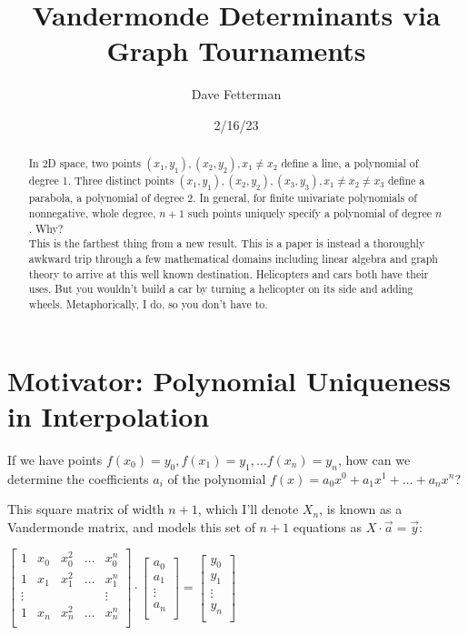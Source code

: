 \documentclass[11pt, oneside]{article} 	%
\title{Vandermonde Determinants via Graph Tournaments}
\author{Dave Fetterman}
\affil{Obviously Unemployed}
\date{2/16/23}
\begin{document}
\maketitle

\begin{abstract}

In 2D space, two points $(x_1, y_1), (x_2, y_2), x_1 \neq x_2$ define a line, a polynomial of degree 1.  Three distinct points $(x_1, y_1), (x_2, y_2), (x_3, y_3), x_1 \neq x_2 \neq x_3$ define a parabola, a polynomial of degree 2.  In general, for finite univariate polynomials of nonnegative, whole degree, $n+1$ such points uniquely specify a polynomial of degree $n$.  Why?
\\

This is the farthest thing from a new result. This is a paper is instead a thoroughly awkward trip through a few mathematical domains including linear algebra and graph theory to arrive at this well known destination. Helicopters and cars both have their uses. But you wouldn't build a car by turning a helicopter on its side and adding wheels.  Metaphorically, I do, so you don't have to.

\end{abstract}

\section{Motivator: Polynomial Uniqueness in Interpolation}

If we have points $f(x_0) = y_0, f(x_1) = y_1,  \ldots f(x_{n}) = y_{n}$, how can we determine the coefficients $a_i$ of the polynomial $f(x) = a_0x^0 + a_1x^1 + \ldots + a_nx^n$?

This square matrix of width $n+1$, which I'll denote $X_n$, is known as a Vandermonde matrix\cite{1}, and models this set of $n+1$ equations as $X \cdot \vec{a} = \vec{y}$:

 $\begin{bmatrix}
1 & x_0 & x_0^2 & \ldots & x_0^{n} \\
1 & x_1 & x_1^2 & \ldots & x_1^{n} \\
\vdots & & & & \vdots  \\
1 & x_{n} & x_{n}^2 & \ldots & x_{n}^{n} \\
\end{bmatrix}
\cdot 
\begin{bmatrix}
a_0 \\
a_1 \\
\vdots \\
a_n \\
\end{bmatrix}
=
\begin{bmatrix}
y_0 \\
y_1 \\
\vdots \\
y_{n} \\
\end{bmatrix}
$
\\
\end{document}
